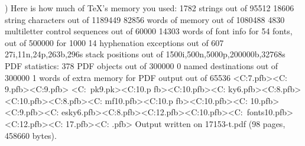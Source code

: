  ) 
Here is how much of TeX's memory you used:
 1782 strings out of 95512
 18606 string characters out of 1189449
 82856 words of memory out of 1080488
 4830 multiletter control sequences out of 60000
 14303 words of font info for 54 fonts, out of 500000 for 1000
 14 hyphenation exceptions out of 607
 27i,11n,24p,263b,296s stack positions out of 1500i,500n,5000p,200000b,32768s
PDF statistics:
 378 PDF objects out of 300000
 0 named destinations out of 300000
 1 words of extra memory for PDF output out of 65536
<C:\texmf\fonts{}\bluesky\symbols\msbm7.pfb><C:\texmf\fonts{}\bluesky
\cm\cmsy9.pfb><C:\texmf\fonts{}\bluesky\cm\cmmi9.pfb> <C:\localtexmf\fonts\
pk\ljfour\ams\cmextra{}\cmex9.pk><C:\texmf\fonts{}\bluesky\cm\cmex10.p
fb><C:\texmf\fonts{}\bluesky\symbols\msbm10.pfb><C:\texmf\fonts{}\cm\cmsy6.pfb><C:\texmf\fonts{}\bluesky\cm\cmmi8.pfb><C:\texmf\fonts{}\bluesky\symbols\msam10.pfb><C:\texmf\fonts{}\bluesky\cm\cmsy8.pfb><C:\fonts{}\bluesky\cm\cmmi10.pfb><C:\texmf\fonts{}\bluesky\cm\cmbsy10.p
fb><C:\texmf\fonts{}\bluesky\cm\cmsy10.pfb><C:\texmf\fonts{}\bluesky\cm
\cmbx10.pfb><C:\texmf\fonts{}\bluesky\cm\cmr9.pfb><C:\texmf\fonts{}\cm\cmr6.pfb><C:\texmf\fonts{}\bluesky\cm\cmr8.pfb><C:\texmf\fonts{}\bluesky\cm\cmbx12.pfb><C:\texmf\fonts{}\bluesky\cm\cmcsc10.pfb><C:\texmf\
fonts\type1\bluesky\cm\cmr10.pfb><C:\texmf\fonts{}\bluesky\cm\cmr12.pfb><C:
\texmf\fonts\type1\bluesky\cm\cmr17.pfb><C:\texmf\fonts\type1\bluesky\cm\cmtt10
.pfb>
Output written on 17153-t.pdf (98 pages, 458660 bytes).
